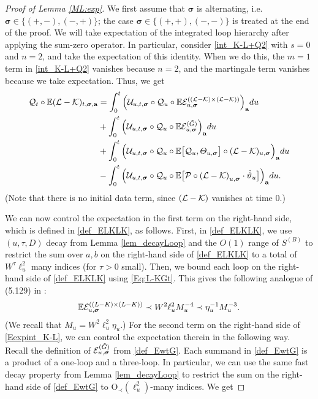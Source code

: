 \begin{proof}[Proof of Lemma \ref{ML:exp}]

We first assume that $\boldsymbol{\sigma}$ is alternating, i.e. $\boldsymbol{\sigma}\in\{(+,-),(-,+)\}$; the case $\boldsymbol{\sigma}\in\{(+,+),(-,-)\}$ is treated at the end of the proof. We will take expectation of the integrated loop hierarchy after applying the sum-zero operator. In particular, consider \eqref{int_K-L+Q2} with $s=0$ and $n=2$, and take the expectation of this identity. When we do this, the $m=1$ term in \eqref{int_K-L+Q2} vanishes because $n=2$, and the martingale term vanishes because we take expectation. Thus, we get
%
\begin{align}
{\cal Q}_{t}\circ \mathbb{E}({\cal L}-{\cal K})_{t,\boldsymbol{\sigma},\textbf{a}}&=\int_{0}^{t}\Big({\cal U}_{u,t,\boldsymbol{\sigma}} \circ {\cal Q}_{u} \circ \mathbb{E} {\cal E}^{(({\cal L}-{\cal K})\times({\cal L}-{\cal K}))}_{u,\boldsymbol{\sigma}}\Big)_{\textbf{a}}du\label{Eexpint_K-L}\\
&+\int_{0}^{t}\Big({\cal U}_{u,t,\boldsymbol{\sigma}} \circ {\cal Q}_{u} \circ \mathbb{E} {\cal E}^{(\tilde{G})}_{u,\boldsymbol{\sigma}}\Big)_{\textbf{a}}du\nonumber\\
&+\int_{0}^{t}\Big({\cal U}_{u,t,\boldsymbol{\sigma}} \circ {\cal Q}_{u} \circ \mathbb{E}\big[{\cal Q}_u , \varTheta_{u,\boldsymbol{\sigma}} \big]\circ (\mathcal{L} - \mathcal{K}) _{u, \boldsymbol{\sigma}}\Big)_{\textbf{a}}du\nonumber\\
&-\int_{0}^{t}\Big({\cal U}_{u,t,\boldsymbol{\sigma}} \circ {\cal Q}_{u} \circ \mathbb{E}\big[{\cal P} \circ
      \left(\mathcal{L} - \mathcal{K}\right)_{u, \boldsymbol{\sigma}}
        \cdot \dot \vartheta_{u }\big]\Big)_{\textbf{a}}du.\nonumber
\end{align}
%
(Note that there is no initial data term, since $({\cal L}-{\cal K})$ vanishes at time $0$.)

We can now control the expectation in the first term on the right-hand side, which is defined in \eqref{def_ELKLK}, as follows. First, in \eqref{def_ELKLK}, we use $(u,\tau,D)$ decay from Lemma \ref{lem_decayLoop} and the $O(1)$ range of $S^{(B)}$ to restrict the sum over $a,b$ on the right-hand side of \eqref{def_ELKLK} to a total of $W^{\tau}\ell_{u}^{2}$ many indices (for $\tau>0$ small). Then, we bound each loop on the right-hand side of \eqref{def_ELKLK} using \eqref{Eq:L-KGt}. This gives the following analogue of (5.129) in \cite{YY_25}:
%
\begin{align}
\mathbb{E}{\cal E}^{((L-K)\times(L-K))}_{u,\boldsymbol{\sigma}}\prec W^{2}\ell_{u}^{2}M_{u}^{-4}\prec \eta_{u}^{-1}M_{u}^{-3}.\label{eq:LKLKstep6}
\end{align}
%
(We recall that $M_{u}=W^{2}\ell_{u}^{2}\eta_{u}$.) For the second term on the right-hand side of \eqref{Eexpint_K-L}, we can control the expectation therein in the following way. Recall the definition of ${\cal E}^{(\tilde{G})}_{u,\boldsymbol{\sigma}}$ from \eqref{def_EwtG}. Each summand in \eqref{def_EwtG} is a product of a one-loop and a three-loop. In particular, we can use the same fast decay property from Lemma \ref{lem_decayLoop} to restrict the sum on the right-hand side of \eqref{def_EwtG} to $\mathrm{O}_{\prec}(\ell_{u}^{2})$-many indices. We get


\end{proof}
